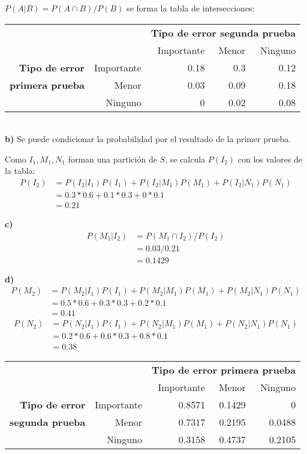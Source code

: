 \documentclass[12pt]{article}
\begin{document}
$P(A|B)=P(A \cap B)/P(B)$ se forma la tabla de intersecciones:\\

\begin{tabular}{r r r r r}
  &&\multicolumn{3}{l}{\textbf{Tipo de error segunda prueba}}\\
  &&Importante&Menor&Ninguno\\
  \textbf{Tipo de error}&Importante&0.18&0.3&0.12\\
  \textbf{primera prueba}&Menor&0.03&0.09&0.18\\
  &Ninguno&0&0.02&0.08\\
\end{tabular}\\

\textbf{b)}
Se puede condicionar la probabilidad por el resultado de la primer prueba.

Como $I_1,M_1,N_1$ forman una partición de $S$, se calcula $P(I_2)$ con los valores de la tabla:
\begin{align*}
  P(I_2)&=P(I_2|I_1)P(I_1)+P(I_2|M_1)P(M_1)+P(I_2|N_1)P(N_1)\\
        &=0.3*0.6+0.1*0.3+0*0.1\\
        &=0.21
\end{align*}

\textbf{c)}
\begin{align*}
  P(M_1|I_2)&=P(M_1 \cap I_2)/P(I_2)\\
            &=0.03/0.21\\
            &=0.1429
\end{align*}

\textbf{d)}
\begin{align*}
  P(M_2)&=P(M_2|I_1)P(I_1)+P(M_2|M_1)P(M_1)+P(M_2|N_1)P(N_1)\\
        &=0.5*0.6+0.3*0.3+0.2*0.1\\
        &=0.41
\end{align*}
\begin{align*}
  P(N_2)&=P(N_2|I_1)P(I_1)+P(N_2|M_1)P(M_1)+P(N_2|N_1)P(N_1)\\
        &=0.2*0.6+0.6*0.3+0.8*0.1\\
        &=0.38
\end{align*}

\begin{tabular}{r r r r r}
  &&\multicolumn{3}{l}{\textbf{Tipo de error primera prueba}}\\
  &&Importante&Menor&Ninguno\\
  \textbf{Tipo de error}&Importante&0.8571&0.1429&0\\
  \textbf{segunda prueba}&Menor&0.7317&0.2195&0.0488\\
  &Ninguno&0.3158&0.4737&0.2105
\end{tabular}\\
\end{document}
